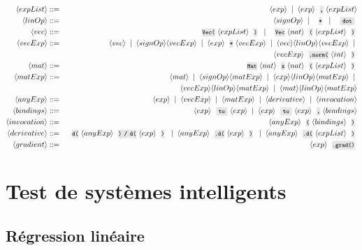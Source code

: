 \begin{eqnarray*}
\bnfrl{expList} & ::= & \bnfrl{exp} \mor \bnfrl{exp} \code{,} \bnfrl{expList} \\
\bnfrl{linOp} & ::= & \bnfrl{signOp} \mor \code{*} \mor \code{ dot } \\
\bnfrl{vec} & ::= & \code{Vec(} \bnfrl{expList} \code{)} \mor \code{Vec} \bnfrl{nat} \code{(} \bnfrl{expList} \code{)} \\
\bnfrl{vecExp} & ::= & \bnfrl{vec} \mor \bnfrl{signOp}\bnfrl{vecExp} \mor \bnfrl{exp} \code{*} \bnfrl{vecExp} \mor \bnfrl{vec} \bnfrl{linOp} \bnfrl{vecExp} \mor \\
&&\bnfrl{vecExp}\code{.norm(}\bnfrl{int}\code{)} \\
\bnfrl{mat} & ::= & \code{Mat} \bnfrl{nat} \code{x} \bnfrl{nat} \code{(} \bnfrl{expList} \code{)} \\
\bnfrl{matExp} & ::= & \bnfrl{mat} \mor \bnfrl{signOp}\bnfrl{matExp} \mor \bnfrl{exp}\bnfrl{linOp}\bnfrl{matExp} \mor \\
&&\bnfrl{vecExp}\bnfrl{linOp}\bnfrl{matExp} \mor \bnfrl{mat} \bnfrl{linOp} \bnfrl{matExp} \\
\bnfrl{anyExp} & ::= & \bnfrl{exp} \mor \bnfrl{vecExp} \mor \bnfrl{matExp} \mor \bnfrl{derivative} \mor \bnfrl{invocation} \\
\bnfrl{bindings} & ::= & \bnfrl{exp} \code{ to } \bnfrl{exp} \mor \bnfrl{exp} \code{ to } \bnfrl{exp} \code{,} \bnfrl{bindings} \\
\bnfrl{invocation} & ::= & \bnfrl{anyExp} \code{(} \bnfrl{bindings} \code{)} \\
\bnfrl{derivative} & ::= & \code{d(} \bnfrl{anyExp} \code{) / d(} \bnfrl{exp} \code{)} \mor \bnfrl{anyExp} \code{.d(} \bnfrl{exp} \code{)} \mor \bnfrl{anyExp} \code{.d(} \bnfrl{expList} \code{)} \\
\bnfrl{gradient} & ::= & \bnfrl{exp} \code{.grad()}
\end{eqnarray*}

\chapter{Test de systèmes intelligents}

\section{Régression linéaire}\label{sec:lin_reg}

